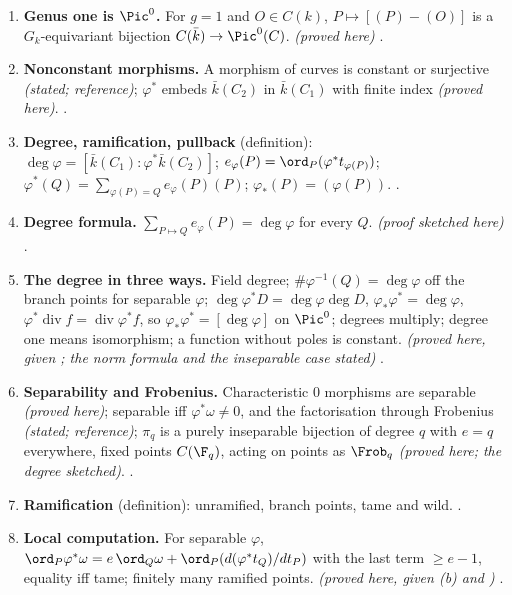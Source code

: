 \begin{enumerate}[label=\textbf{\thechapter.\arabic*}]
\item \textbf{Genus one is $\Pic^0$.} For $g=1$ and $O\in C(k)$, $P\mapsto[(P)-(O)]$ is a $G_k$-equivariant bijection $C(\bar k)\to\Pic^0(C)$. \emph{(proved here)}
.
\item \textbf{Nonconstant morphisms.} A morphism of curves is constant or surjective \emph{(stated; reference)}; $\varphi^*$ embeds $\bar k(C_2)$ in $\bar k(C_1)$ with finite index \emph{(proved here)}.
.
\item \textbf{Degree, ramification, pullback} (definition): $\deg\varphi=[\bar k(C_1):\varphi^*\bar k(C_2)]$; $e_\varphi(P)=\ord_P(\varphi^*t_{\varphi(P)})$; $\varphi^*(Q)=\sum_{\varphi(P)=Q}e_\varphi(P)(P)$; $\varphi_*(P)=(\varphi(P))$.
.
\item \textbf{Degree formula.} $\sum_{P\mapsto Q}e_\varphi(P)=\deg\varphi$ for every $Q$. \emph{(proof sketched here)} .
\item \textbf{The degree in three ways.} Field degree; $\#\varphi^{-1}(Q)=\deg\varphi$ off the branch points for separable $\varphi$; $\deg\varphi^*D=\deg\varphi\deg D$, $\varphi_*\varphi^*=\deg\varphi$,
$\varphi^*\operatorname{div}f=\operatorname{div}\varphi^*f$, so $\varphi_*\varphi^*=[\deg\varphi]$ on $\Pic^0$; degrees multiply; degree one means isomorphism; a function without poles is constant.
\emph{(proved here, given ; the norm formula and the inseparable case stated)} .
\item \textbf{Separability and Frobenius.} Characteristic $0$ morphisms are separable \emph{(proved here)}; separable iff $\varphi^*\omega\ne0$, and the factorisation through Frobenius
\emph{(stated; reference)}; $\pi_q$ is a purely inseparable bijection of degree $q$ with $e=q$ everywhere, fixed points $C(\F_q)$, acting on points as $\Frob_q$ \emph{(proved here; the degree
sketched)}. .
\item \textbf{Ramification} (definition): unramified, branch points, tame and wild. .
\item \textbf{Local computation.} For separable $\varphi$, $\ord_P\varphi^*\omega=e\,\ord_Q\omega+\ord_P(d(\varphi^*t_Q)/dt_P)$ with the last term $\ge e-1$, equality iff tame; finitely many ramified points.
\emph{(proved here, given (b) and )} .

\end{enumerate}
